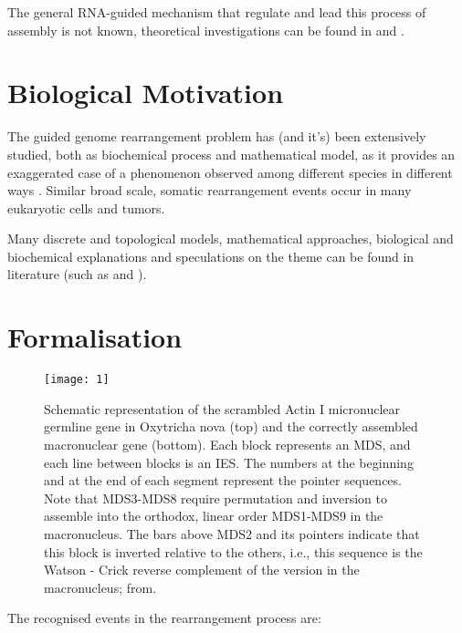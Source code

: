 The general RNA-guided mechanism that regulate and lead this process of assembly is not known, theoretical investigations can be found in \cite{Brijder2007} and \cite{Ehrenfeucht:2004:CLC:971120}.

\section{Biological Motivation}
The guided genome rearrangement problem has (and it's) been extensively \cite{Ehrenfeucht:2004:CLC:971120} studied, both as biochemical process and mathematical model, as it provides an exaggerated case of a phenomenon observed among different species in different ways \cite{ANGELESKA20093020}. Similar broad scale, somatic rearrangement events occur in many eukaryotic cells and tumors.

Many discrete and topological models, mathematical approaches, biological and biochemical explanations and speculations on the theme can be found in literature (such as \cite{prescott2001} \cite{Brijder2014} \cite{ANGELESKA2007706} and \cite{programmedgenome}).

\section{Formalisation}

\begin{figure}[h]
  \centering
    \texttt{[image: 1]}
  \caption{Schematic representation of the scrambled Actin I micronuclear germline gene in Oxytricha nova (top) and the correctly assembled macronuclear gene (bottom). Each block represents an MDS, and each line between blocks is an IES. The numbers at the beginning and at the end of each segment represent the pointer sequences. Note that MDS3-MDS8 require permutation and inversion to assemble into the orthodox, linear order MDS1-MDS9 in the macronucleus. The bars above MDS2 and its pointers indicate that this block is inverted relative to the others, i.e., this sequence is the Watson - Crick reverse complement of the version in the macronucleus; from\cite{prescottgreslin}.}

\end{figure}

The recognised events in the rearrangement process are:

